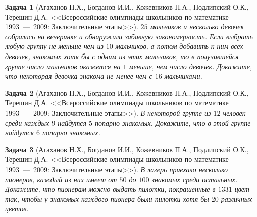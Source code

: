 \documentclass[12pt,a4paper,fleqn]{article}
\newtheorem{exersize}{Задача}
\begin{document}
\begin{exersize}[Агаханов Н.Х., Богданов И.И., Кожевников П.А., Подлипский О.К., Терешин Д.А. <<Всероссийские олимпиады школьников по математике 1993~---~2009: Заключительные этапы>>]
	$25$ мальчиков и несколько девочек собрались на вечеринке и обнаружили забавную закономерность. Если выбрать любую группу не меньше чем из $10$ мальчиков, а потом добавить к ним всех девочек, знакомых хотя бы с одним из этих мальчиков, то в получившейся группе число мальчиков окажется на $1$ меньше, чем число девочек. Докажите, что некоторая девочка знакома не менее чем с $16$ мальчиками.
\end{exersize}	 

\begin{exersize}[Агаханов Н.Х., Богданов И.И., Кожевников П.А., Подлипский О.К., Терешин Д.А. <<Всероссийские олимпиады школьников по математике 1993~---~2009: Заключительные этапы>>]
	В некоторой группе из $12$ человек среди каждых $9$ найдутся $5$ попарно знакомых. Докажите, что в этой группе найдутся $6$ попарно знакомых.
\end{exersize}	 

\begin{exersize}[Агаханов Н.Х., Богданов И.И., Кожевников П.А., Подлипский О.К., Терешин Д.А. <<Всероссийские олимпиады школьников по математике 1993~---~2009: Заключительные этапы>>]
	В лагерь приехало несколько пионеров, каждый из них имеет от $50$ до $100$ знакомых среди остальных. Докажите, что пионерам можно выдать пилотки, покрашенные в $1331$ цвет так, чтобы у знакомых каждого пионера были пилотки хотя бы $20$ различных цветов.
\end{exersize}	 
\end{document}
